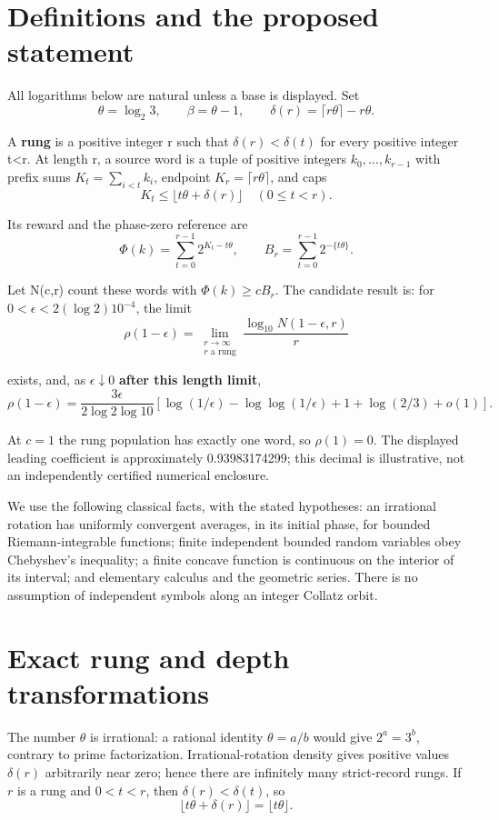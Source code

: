 \documentclass[11pt,letterpaper]{article}
\begin{document}
\section{Definitions and the proposed statement}

All logarithms below are natural unless a base is displayed. Set
\[
\theta=\log_2 3,\qquad \beta=\theta-1,\qquad
\delta(r)=\lceil r\theta\rceil-r\theta.
\]

A \textbf{rung} is a positive integer r such that $\delta(r)<\delta(t)$ for every positive integer t<r. At length r, a source word is a tuple of positive integers $k_0,\ldots,k_{r-1}$ with prefix sums $K_t=\sum_{i<t}k_i$, endpoint $K_r=\lceil r\theta\rceil$, and caps
\[
K_t\le \lfloor t\theta+\delta(r)\rfloor\quad(0\le t<r).
\]

Its reward and the phase-zero reference are
\[
\Phi(k)=\sum_{t=0}^{r-1}2^{K_t-t\theta},\qquad
B_r=\sum_{t=0}^{r-1}2^{-\{t\theta\}}.
\]

Let N(c,r) count these words with $\Phi(k)\ge cB_r$. The candidate result is: for $0<\epsilon<2(\log 2)10^{-4}$, the limit
\[
\rho(1-\epsilon)=\lim_{\substack{r\to\infty\\r\text{ a rung}}}
 \frac{\log_{10}N(1-\epsilon,r)}r
\]

exists, and, as $\epsilon\downarrow0$ \textbf{after this length limit},
\[
\rho(1-\epsilon)=\frac{3\epsilon}{2\log 2\log 10}
 \left[\log(1/\epsilon)-\log\log(1/\epsilon)
       +1+\log(2/3)+o(1)\right].
\]

At $c=1$ the rung population has exactly one word, so $\rho(1)=0$. The displayed leading coefficient is approximately 0.93983174299; this decimal is illustrative, not an independently certified numerical enclosure.

We use the following classical facts, with the stated hypotheses: an irrational rotation has uniformly convergent averages, in its initial phase, for bounded Riemann-integrable functions; finite independent bounded random variables obey Chebyshev's inequality; a finite concave function is continuous on the interior of its interval; and elementary calculus and the geometric series. There is no assumption of independent symbols along an integer Collatz orbit.

\section{Exact rung and depth transformations}

The number $\theta$ is irrational: a rational identity $\theta=a/b$ would give $2^a=3^b$, contrary to prime factorization. Irrational-rotation density gives positive values $\delta(r)$ arbitrarily near zero; hence there are infinitely many strict-record rungs. If $r$ is a rung and $0<t<r$, then $\delta(r)<\delta(t)$, so
\[
\lfloor t\theta+\delta(r)\rfloor=\lfloor t\theta\rfloor.
\]
\end{document}
